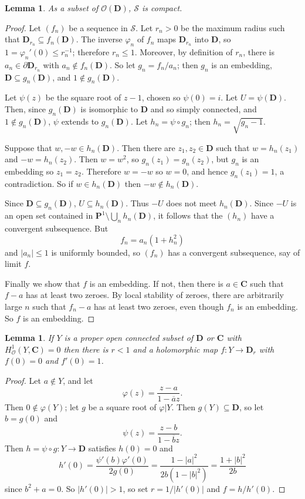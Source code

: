\documentclass[reqno,12pt,letterpaper]{amsart}
\newcommand{\CC}{\mathbf{C}}
\newcommand{\DD}{\mathbf{D}}
\newcommand{\PP}{\mathbf P}
\newcommand{\Olo}{\mathscr O}
\newtheorem{lemma}[theorem]{Lemma}
\theoremstyle{definition}
\begin{document}
\begin{lemma}
As a subset of $\Olo(\DD)$, $\mathscr S$ is compact.
\end{lemma}
\begin{proof}
Let $(f_n)$ be a sequence in $\mathscr S$.
Let $r_n > 0$ be the maximum radius such that $\DD_{r_n} \subseteq f_n(\DD)$.
The inverse $\varphi_n$ of $f_n$ maps $\DD_{r_n}$ into $\DD$, so $1 = \varphi_n'(0) \leq r_n^{-1}$; therefore $r_n \leq 1$.
Moreover, by definition of $r_n$, there is $a_n \in \partial \DD_{r_n}$ with $a_n \notin f_n(\DD)$.
So let $g_n = f_n/a_n$; then $g_n$ is an embedding, $\DD \subseteq g_n(\DD)$, and $1 \notin g_n(\DD)$.

Let $\psi(z)$ be the square root of $z - 1$, chosen so $\psi(0) = i$.
Let $U = \psi(\DD)$.
Then, since $g_n(\DD)$ is isomorphic to $\DD$ and so simply connected, and $1 \notin g_n(\DD)$, $\psi$ extends to $g_n(\DD)$.
Let $h_n = \psi \circ g_n$; then $h_n = \sqrt{g_n - 1}$.

Suppose that $w, -w \in h_n(\DD)$. Then there are $z_1,z_2 \in \DD$ such that $w = h_n(z_1)$ and $-w = h_n(z_2)$.
Then $w = w^2$, so $g_n(z_1) = g_n(z_2)$, but $g_n$ is an embedding so $z_1 = z_2$.
Therefore $w = -w$ so $w = 0$, and hence $g_n(z_1) = 1$, a contradiction.
So if $w \in h_n(\DD)$ then $-w \notin h_n(\DD)$.

Since $\DD \subseteq g_n(\DD)$, $U \subseteq h_n(\DD)$.
Thus $-U$ does not meet $h_n(\DD)$.
Since $-U$ is an open set contained in $\PP^1 \setminus \bigcup_n h_n(\DD)$, it follows that the $(h_n)$ have a convergent subsequence.
But
$$f_n = a_n(1 + h_n^2)$$
and $|a_n| \leq 1$ is uniformly bounded, so $(f_n)$ has a convergent subsequence, say of limit $f$.

Finally we show that $f$ is an embedding. If not, then there is $a \in \CC$ such that $f - a$ has at least two zeroes.
By local stability of zeroes, there are arbitrarily large $n$ such that $f_n - a$ has at least two zeroes, even though $f_n$ is an embedding.
So $f$ is an embedding.
\end{proof}

\begin{lemma}
\label{maps between discs}
If $Y$ is a proper open connected subset of $\DD$ or $\CC$ with $H^1_\Olo(Y, \CC) = 0$ then there is $r < 1$ and a holomorphic map $f: Y \to \DD_r$ with $f(0) = 0$ and $f'(0) = 1$.
\end{lemma}
\begin{proof}
Let $a \notin Y$, and let
$$\varphi(z) = \frac{z - a}{1 - \overline az}.$$
Then $0 \notin \varphi(Y)$; let $g$ be a square root of $\varphi|Y$.
Then $g(Y) \subseteq \DD$, so let $b = g(0)$ and
$$\psi(z) = \frac{z - b}{1 - \overline bz}.$$
Then $h = \psi \circ g: Y \to \DD$ satisfies $h(0) = 0$ and
$$h'(0) = \frac{\psi'(b)\varphi'(0)}{2g(0)} = \frac{1 - |a|^2}{2b(1 - |b|^2)} = \frac{1 + |b|^2}{2b}$$
since $b^2 + a = 0$. So $|h'(0)| > 1$, so set $r = 1/|h'(0)|$ and $f = h/h'(0)$.
\end{proof}
\end{document}
